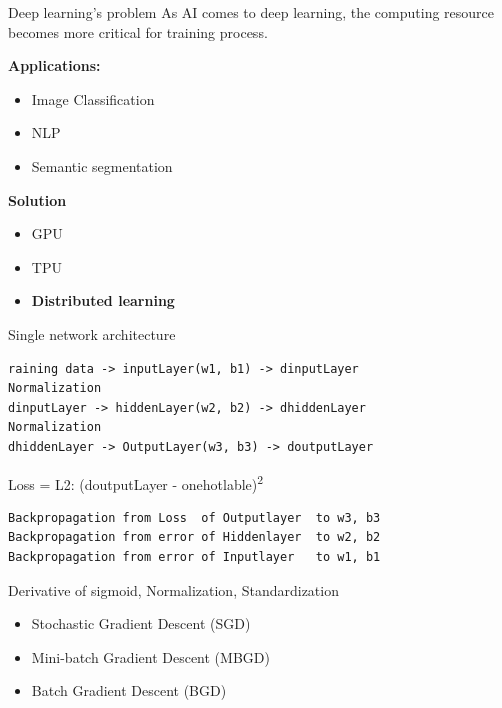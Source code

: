 \documentclass[presentation]{beamer}
\begin{document}
\begin{frame}[label={sec:org7f90c09}]{Deep learning's problem}
As AI comes to deep learning, the computing resource becomes more critical for training process.

\textbf{Applications:}
\begin{itemize}
\item Image Classification
\item NLP
\item Semantic segmentation
\end{itemize}

\textbf{Solution}
\begin{itemize}
\item GPU
\item TPU
\item \textbf{Distributed learning}
\end{itemize}
\end{frame}

\begin{frame}[label={sec:orga4083ae},fragile]{Single network architecture}
 \begin{verbatim}
raining data -> inputLayer(w1, b1) -> dinputLayer
Normalization
dinputLayer -> hiddenLayer(w2, b2) -> dhiddenLayer
Normalization
dhiddenLayer -> OutputLayer(w3, b3) -> doutputLayer
\end{verbatim}
Loss = L2: (doutputLayer - onehotlable)\textsuperscript{2}
\begin{verbatim}
Backpropagation from Loss  of Outputlayer  to w3, b3
Backpropagation from error of Hiddenlayer  to w2, b2
Backpropagation from error of Inputlayer   to w1, b1
\end{verbatim}

Derivative of sigmoid, Normalization, Standardization

\begin{itemize}
\item Stochastic Gradient Descent (SGD)
\item Mini-batch Gradient Descent (MBGD)
\item Batch Gradient Descent (BGD)
\end{itemize}
\end{frame}
\end{document}
